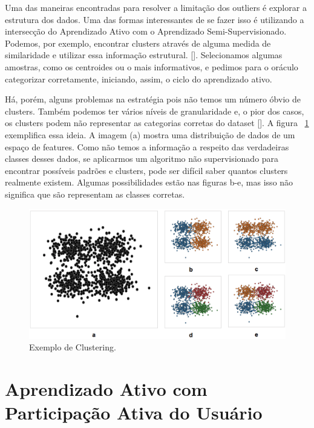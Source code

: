 Uma das maneiras encontradas para resolver a limitação dos outliers é explorar a estrutura dos dados. Uma das formas interessantes de se fazer isso é utilizando a intersecção do Aprendizado Ativo com o Aprendizado Semi-Supervisionado. Podemos, por exemplo, encontrar clusters através de alguma medida de similaridade e utilizar essa informação estrutural. [\cite{saito2014active, dasgupta2011two}]. Selecionamos algumas amostras, como os centroides ou o mais informativos, e pedimos para o oráculo categorizar corretamente, iniciando, assim, o ciclo do aprendizado ativo. 

Há, porém, alguns problemas na estratégia pois não temos um número óbvio de clusters. Também podemos ter vários níveis de granularidade e, o pior dos casos, os clusters podem não representar as categorias corretas do dataset [\cite{dasgupta2011two, settles2014active}].  A figura ~\ref{fig:toy_example_clustering} exemplifica essa ideia. A imagem (a) mostra uma distribuição de dados de um espaço de features. Como não temos a informação a respeito das verdadeiras classes desses dados, se aplicarmos um algoritmo não supervisionado para encontrar possíveis padrões e clusters, pode ser difícil saber quantos clusters realmente existem. Algumas possibilidades estão nas figuras b-e, mas isso não significa que são representam as classes corretas. 


\begin{figure}
  \centering
  \includegraphics[width=1.0\textwidth]{figures/toy_example_clustering.png}
  \caption{Exemplo de Clustering.}
  \label{fig:toy_example_clustering}
\end{figure}


\section{Aprendizado Ativo com Participação Ativa do Usuário}
\label{sec:aprendizado_ativo_variacoes}


